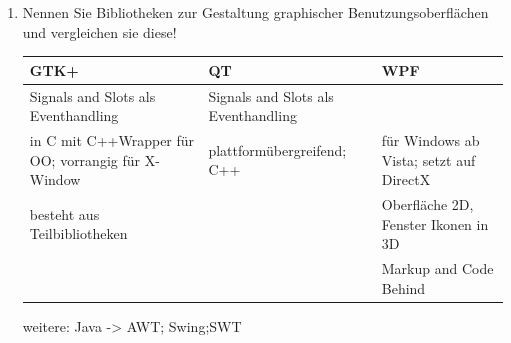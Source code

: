 \begin{enumerate}
	\item Nennen Sie Bibliotheken zur Gestaltung graphischer
	Benutzungsoberflächen und vergleichen sie diese!
	\begin{table}[!h]
		\centering
		\begin{tabular}{|p{13em}|p{13em}|p{13em}|}
			\hline
			\textbf{GTK+} & \textbf{QT} & \textbf{WPF}\\
			\hline
			Signals and Slots als Eventhandling & Signals and Slots als Eventhandling&\\
			\hline
			in C mit C++Wrapper für OO; vorrangig für X-Window& plattformübergreifend; C++ & für Windows ab Vista; setzt auf DirectX \\
			\hline
			besteht aus Teilbibliotheken & & Oberfläche 2D, Fenster Ikonen in 3D\\
			\hline
			&& Markup and Code Behind\\
			\hline
		\end{tabular}
	\end{table}
	weitere: Java -> AWT; Swing;SWT
\end{enumerate}

